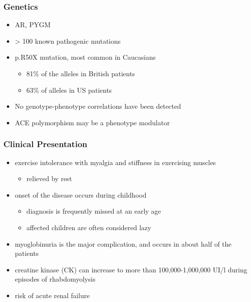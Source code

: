 \documentclass{scrartcl}
\begin{document}
\subsubsection{Genetics}
\label{sec:org0733106}
\begin{itemize}
\item AR, PYGM
\item \textgreater{} 100 known pathogenic mutations
\item p.R50X mutation, most common in Caucasians
\begin{itemize}
\item 81\% of the alleles in British patients
\item 63\% of alleles in US patients
\end{itemize}
\item No genotype-phenotype correlations have been detected
\item ACE polymorphism may be a phenotype modulator
\end{itemize}

\subsubsection{Clinical Presentation}
\label{sec:org34ac9db}
\begin{itemize}
\item exercise intolerance with myalgia and stiffness in exercising muscles
\begin{itemize}
\item relieved by rest
\end{itemize}
\item onset of the disease occurs during childhood
\begin{itemize}
\item diagnosis is frequently missed at an early age
\item affected children are often considered lazy
\end{itemize}
\item myoglobinuria is the major complication, and occurs in about half of
the patients
\item creatine kinase (CK) can increase to more than 100,000-1,000,000
UI/l during episodes of rhabdomyolysis
\item risk of acute renal failure
\end{itemize}
\end{document}

